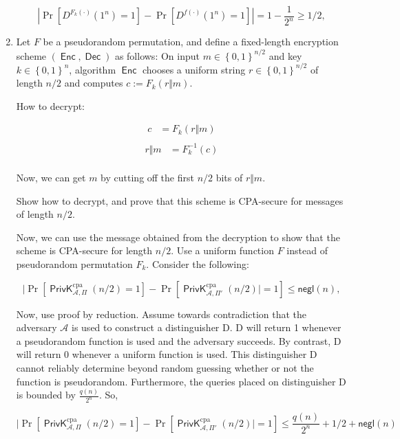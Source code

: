 \documentclass{article}
\DeclareMathOperator{\PrivK}{\textsf{PrivK}}
\DeclareMathOperator{\Enc}{\textsf{Enc}}
\DeclareMathOperator{\Dec}{\textsf{Dec}}
\begin{document}
\begin{enumerate}
    \[
        \left| \Pr\left[D^{F_k(\cdot)}(1^n) = 1\right] -
      \Pr\left[D^{f(\cdot)}(1^n) = 1\right] \right| 
      = 1 - \frac{1}{2^n}
      \geq 1/2,
      \]
    
  \item Let $F$ be a pseudorandom permutation, and define a fixed-length
    encryption scheme $(\Enc, \Dec)$ as follows: On input $m \in
    \left\{0, 1\right\}^{n / 2}$ and key $k \in \left\{0, 1\right\}^n$,
    algorithm $\Enc$ chooses a uniform string $r \in \left\{0,
    1\right\}^{n/2}$ of length $n/2$ and computes $c := F_k(r \Vert m)$.

    How to decrypt:

    \begin{align*}
      c &= F_k(r \Vert m)\\
    \end{align*}
    \begin{align*}
      r \Vert m &= F^{-1}_k(c)\\
    \end{align*}

    Now, we can get $m$ by cutting off the first $n / 2$ bits of $r \Vert m$.

    Show how to decrypt, and prove that this scheme is CPA-secure for
    messages of length $n / 2$.

    Now, we can use the message obtained from the decryption to show that the scheme is CPA-secure for length $n/2$. Use a uniform function $F$ instead of pseudorandom permutation $F_k$. Consider the following:

    \[
          | \Pr\left[\PrivK_{\mathcal{A}, \Pi}^\text{cpa}(n/2) = 1\right] - 
          \Pr\left[\PrivK_{\mathcal{A}, \Pi\prime}^\text{cpa}(n/2) | = 1\right]
          \leq
          \textsf{negl}(n),
        \]

    Now, use proof by reduction. Assume towards contradiction that the adversary $\mathcal{A}$ is used to construct a distinguisher D. D will return 1 whenever a pseudorandom function is used and the adversary succeeds. By contrast, D will return 0 whenever a uniform function is used. This distinguisher D cannot reliably determine beyond random guessing whether or not the function is pseudorandom. Furthermore, the queries placed on distinguisher D is bounded by $\frac{q(n)}{2^n}$. So, 

    \[
          | \Pr\left[\PrivK_{\mathcal{A}, \Pi}^\text{cpa}(n/2) = 1\right] - 
          \Pr\left[\PrivK_{\mathcal{A}, \Pi\prime}^\text{cpa}(n/2) | = 1\right]
          \leq
          \frac{q(n)}{2^n} + 1/2 + \textsf{negl}(n)
        \]
    

\end{enumerate}
\end{document}
